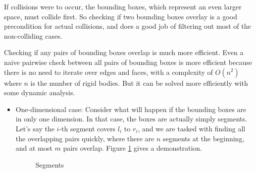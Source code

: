 \documentclass[12pt,a4paper,twoside,openright]{report}
\begin{document}
If collisions were to occur, the bounding boxes, which represent an even larger space, must collide first. So checking if two bounding boxes overlay is a good precondition for actual collisions, and does a good job of filtering out most of the non-colliding cases.

Checking if any pairs of bounding boxes overlap is much more efficient. Even a naive pairwise check between all pairs of bounding boxes is more efficient because there is no need to iterate over edges and faces, with a complexity of $O(n^2)$ where $n$ is the number of rigid bodies. But it can be solved more efficiently with some dynamic analysis\cite{nievergelt1982plane}.

\begin{itemize}
\item One-dimensional case: Consider what will happen if the bounding boxes are in only one dimension. In that case, the boxes are actually simply segments. Let's say the $i$-th segment covers $l_i$ to $r_i$, and we are tasked with finding all the overlapping pairs quickly, where there are $n$ segments at the beginning, and at most $m$ pairs overlap. Figure \ref{seglbl} gives a demonstration.

\begin{figure}
    \begin{center}
      \end{center}
    \caption{Segments}
    \label{seglbl}
\end{figure}


\end{itemize}
\end{document}
